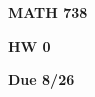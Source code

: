 \documentclass[12pt]{amsart}
\begin{document}
\centerline{\bf MATH 738}
\centerline{\bf HW 0} 
\centerline{\bf Due 8/26}

\vspace{2em}
\end{document}
